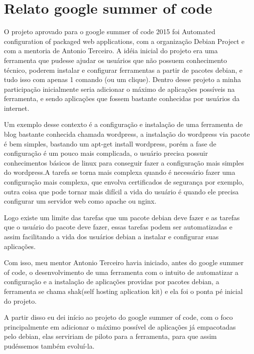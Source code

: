 \section{Relato google summer of code}

O projeto aprovado para o google summer of code 2015 foi Automated configuration
of packaged web applications, com a organização Debian Project e com a mentoria de
Antonio Terceiro. A idéia inicial do projeto era uma ferramenta que
pudesse ajudar os usuários que não possuem conhecimento técnico, poderem
instalar e configurar ferramentas a partir de pacotes debian, e tudo isso com
apenas 1 comando (ou um clique). Dentro desse projeto a minha participação
inicialmente seria adicionar o máximo de aplicações possíveis na ferramenta,
e sendo aplicações que fossem bastante conhecidas por usuários da internet.

Um exemplo desse contexto é a configuração e instalação de uma ferramenta de
blog bastante conhecida chamada wordpress,
a instalação do wordpress via pacote é bem simples, bastando um apt-get install wordpress,
porém a fase de configuração é um pouco mais complicada, o usuário precisa
possuir conhecimentos básicos de linux para conseguir fazer a configuração mais
simples do wordpress.A tarefa se torna mais complexa quando é necessário fazer
uma configuração mais complexa, que envolva certificados de segurança por exemplo,
outra coisa que pode tornar mais difícil a vida do usuário é quando ele precisa
configurar um servidor web como apache ou nginx.

Logo existe um limite das tarefas que um pacote debian deve fazer e as tarefas
que o usuário do pacote deve fazer, essas tarefas podem ser automatizadas e assim
facilitando a vida dos usuários debian a instalar e configurar suas aplicações.

Com isso, meu mentor Antonio Terceiro havia iniciado, antes do google summer of
code, o desenvolvimento de uma ferramenta com o intuito de automatizar a
configuração e a instalação de aplicações providas por pacotes debian, a ferramenta
se chama shak(self hosting aplication kit) e ela foi o ponta pé inicial do projeto.

A partir disso eu dei início ao projeto do google summer of code, com o foco
principalmente em adicionar o máximo possível de aplicações já empacotadas pelo
debian, elas serviriam de piloto para a ferramenta, para que assim pudéssemos
também evoluí-la.

